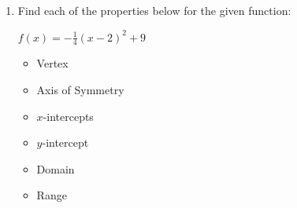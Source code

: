 \documentclass[11pt]{article}
\begin{document}
\begin{enumerate}
{{ \(\boxed{ f^{-1}(x) = x^{3} - 3 \, x^{2} + 3 \, x - 3 }\) 

}
}

\newpage

% 

\item %
\providecommand{\stxKnowl}{}\renewcommand{\stxKnowl}[1]{#1}
\providecommand{\stxOuttro}{}\renewcommand{\stxOuttro}[1]{#1}
\providecommand{\stxTitle}{}\renewcommand{\stxTitle}[1]{#1}
\renewcommand{\stxOuttro}[1]{}
\stxKnowl{
 Find each of the properties below for the given function: 

 \(f(x) = -\frac{1}{4}(x - 2)^2 +9\) 

\begin{itemize}
\item
Vertex

\item
Axis of Symmetry

\item
\(x\)-intercepts

\item
\(y\)-intercept

\item
Domain

\item
Range

\end{itemize}
\stxOuttro{
SOLUTION

 \(\textbf{Direction: } \text{Opens Down}\) 

 \(\textbf{Vertex: } (2, 9)\) 

 \(\textbf{Axis of Symmetry: } x = 2\) 

 \(\textbf{x-intercepts:}\) 

 \(-\frac{1}{4}(x - 2)^2 +9 = 0\) 

 \((x - 2)^2 = 36\) 

 \(x = 2 \pm 6\) 

 \(\boxed{ -4, 8 }\) 

 \(\textbf{y-intercept:}\) 

 \(= -\frac{1}{4}(0 - 2)^2 +9\) 

 \(= -\frac{1}{4}(4) +9\) 

 \(= -1 +9\) 

 \(\boxed{ 8 }\) 

 \(\textbf{Domain: } (-\infty, \infty)\) 

 \(\textbf{Range: } (-\infty, 9]\) 

}}
\end{enumerate}
\end{document}
